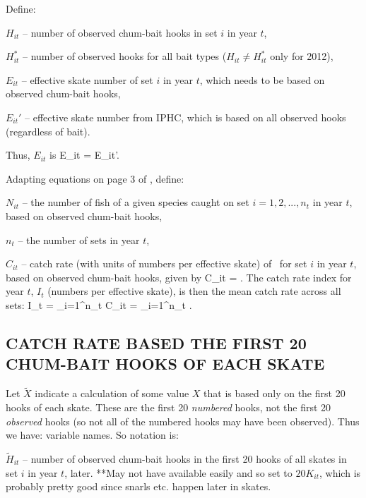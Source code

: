 Define:

$H_{it}$ -- number of observed chum-bait hooks in set $i$ in year
$t$, %

$H_{it}^*$ -- number of observed hooks for all bait types
($H_{it} \neq H_{it}^*$ only for 2012), %

$E_{it}$ -- effective skate number of set $i$ in year $t$, which needs to be
based on observed chum-bait
hooks, %

$E_{it}'$ -- effective skate number from IPHC, which is based on all observed
hooks (regardless of bait). %

Thus, $E_{it}$ is
\eb
E_{it} =  E_{it}'.
\ee

Adapting equations on page 3 of \citet{yocld08}, define:

$N_{it}$ -- the number of fish of a given species caught on set $i=1,2,...,n_t$
in year $t$, based on observed chum-bait hooks, %

$n_t$ -- the number of sets in year
$t$, %

$C_{it}$ -- catch rate (with units of numbers per effective skate) of
\spName~for set $i$ in year $t$, based on observed chum-bait hooks, given by
\eb
C_{it} = .
\label{catchPerSet}
\ee
The catch rate index for year $t$, $I_t$ (numbers per effective skate), is then
the mean catch rate across all sets:
\eb
I_{t} =  \sum_{i=1}^{n_t} C_{it} =  \sum_{i=1}^{n_t} .
\label{index}
\ee

\subsection{CATCH RATE BASED THE FIRST 20 CHUM-BAIT HOOKS OF EACH SKATE}

Let $\tilde{X}$ indicate a calculation of some value $X$ that is based only on
the first 20 hooks of each skate. These are the first 20 \emph{numbered} hooks,
not the first 20 \emph{observed} hooks (so not all of the numbered hooks may
have been observed). Thus we have: %
variable names. So notation is:

$\tilde{H}_{it}$ -- number of observed chum-bait hooks in the first 20 hooks of
all skates in set $i$ in year $t$, %
later. **May not have available easily and so set to $20 K_{it}$, which is
probably pretty good since snarls etc. happen later in skates.

